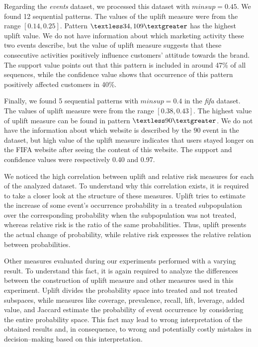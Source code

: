 \documentclass[runningheads,a4paper]{llncs}
\begin{document}
Regarding the \textit{events} dataset, we processed this dataset with $\textit{minsup} = 0.45$.
We found 12 sequential patterns.
The values of the uplift measure were from the range $[0.14, 0.25]$.
Pattern $\textless 34, 109\textgreater$ has the highest uplift value.
We do not have information about which marketing activity these two events describe, but the value of uplift measure suggests that these consecutive activities positively influence customers’ attitude towards the brand.
The support value points out that this pattern is included in around 47\% of all sequences, while the confidence value shows that occurrence of this pattern positively affected customers in 40\%.

Finally, we found 5 sequential patterns with $\textit{minsup}=0.4$ in the \textit{fifa} dataset.
The values of uplift measure were from the range $[0.38, 0.43]$.
The highest value of uplift measure can be found in pattern $\textless 90\textgreater$.
We do not have the information about which website is described by the $90$ event in the dataset, but high value of the uplift measure indicates that users stayed longer on the FIFA website after seeing the content of this website.
The support and confidence values were respectively 0.40 and 0.97.

We noticed the high correlation between uplift and relative risk measures for each of the analyzed dataset.
To understand why this correlation exists, it is required to take a closer look at the structure of these measures.
Uplift tries to estimate the increase of some event's occurrence probability in a treated subpopulation over the corresponding probability when the subpopulation was not treated, whereas relative risk is the ratio of the same probabilities.
Thus, uplift presents the actual change of probability, while relative risk expresses the relative relation between probabilities.

Other measures evaluated during our experiments performed with a varying result.
To understand this fact, it is again required to analyze the differences between the construction of uplift measure and other measures used in this experiment.
Uplift divides the probability space into treated and not treated subspaces, while measures like coverage, prevalence, recall, lift, leverage, added value, and Jaccard estimate the probability of event occurrence by considering the entire probability space.
This fact may lead to wrong interpretation of the obtained results and, in consequence, to wrong and potentially costly mistakes in decision--making based on this interpretation.
\end{document}
